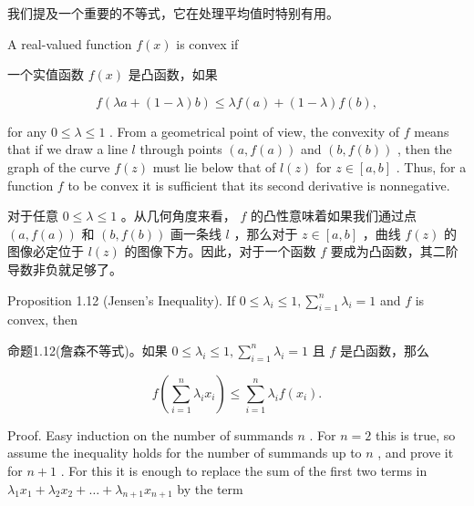 \documentclass[10pt]{article}
\begin{document}
\begin{tcolorbox}\relax
我们提及一个重要的不等式，它在处理平均值时特别有用。
\end{tcolorbox}

A real-valued function \(f\left( x\right)\) is convex if

\begin{tcolorbox}\relax
一个实值函数 \(f\left( x\right)\) 是凸函数，如果
\end{tcolorbox}

\[
f\left( {{\lambda a} + \left( {1 - \lambda }\right) b}\right)  \leq  {\lambda f}\left( a\right)  + \left( {1 - \lambda }\right) f\left( b\right) ,
\]

for any \(0 \leq  \lambda  \leq  1\) . From a geometrical point of view, the convexity of \(f\) means that if we draw a line \(l\) through points \(\left( {a,f\left( a\right) }\right)\) and \(\left( {b,f\left( b\right) }\right)\) , then the graph of the curve \(f\left( z\right)\) must lie below that of \(l\left( z\right)\) for \(z \in  \left\lbrack  {a,b}\right\rbrack\) . Thus, for a function \(f\) to be convex it is sufficient that its second derivative is nonnegative.

\begin{tcolorbox}\relax
对于任意 \(0 \leq  \lambda  \leq  1\) 。从几何角度来看， \(f\) 的凸性意味着如果我们通过点 \(\left( {a,f\left( a\right) }\right)\) 和 \(\left( {b,f\left( b\right) }\right)\) 画一条线 \(l\) ，那么对于 \(z \in  \left\lbrack  {a,b}\right\rbrack\) ，曲线 \(f\left( z\right)\) 的图像必定位于 \(l\left( z\right)\) 的图像下方。因此，对于一个函数 \(f\) 要成为凸函数，其二阶导数非负就足够了。
\end{tcolorbox}

Proposition 1.12 (Jensen’s Inequality). If \(0 \leq  {\lambda }_{i} \leq  1,\mathop{\sum }\limits_{{i = 1}}^{n}{\lambda }_{i} = 1\) and \(f\) is convex, then

\begin{tcolorbox}\relax
命题1.12(詹森不等式)。如果 \(0 \leq  {\lambda }_{i} \leq  1,\mathop{\sum }\limits_{{i = 1}}^{n}{\lambda }_{i} = 1\) 且 \(f\) 是凸函数，那么
\end{tcolorbox}

\[
f\left( {\mathop{\sum }\limits_{{i = 1}}^{n}{\lambda }_{i}{x}_{i}}\right)  \leq  \mathop{\sum }\limits_{{i = 1}}^{n}{\lambda }_{i}f\left( {x}_{i}\right) . \tag{1.14}
\]

Proof. Easy induction on the number of summands \(n\) . For \(n = 2\) this is true, so assume the inequality holds for the number of summands up to \(n\) , and prove it for \(n + 1\) . For this it is enough to replace the sum of the first two terms in \({\lambda }_{1}{x}_{1} + {\lambda }_{2}{x}_{2} + \ldots  + {\lambda }_{n + 1}{x}_{n + 1}\) by the term
\end{document}
